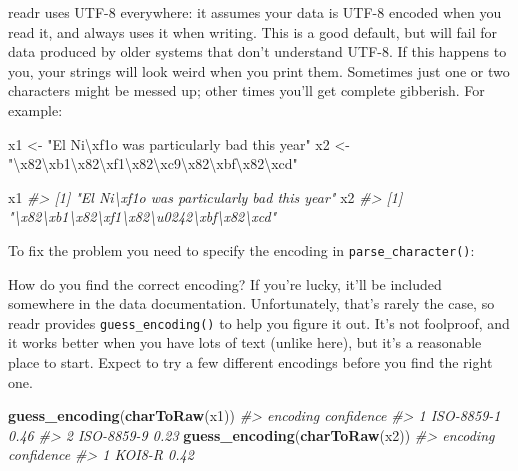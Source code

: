 \documentclass[]{book}
\newenvironment{Shaded}{\begin{snugshade}}{\end{snugshade}}
\newcommand{\KeywordTok}[1]{\textcolor[rgb]{0.13,0.29,0.53}{\textbf{{#1}}}}
\newcommand{\CharTok}[1]{\textcolor[rgb]{0.31,0.60,0.02}{{#1}}}
\newcommand{\StringTok}[1]{\textcolor[rgb]{0.31,0.60,0.02}{{#1}}}
\newcommand{\CommentTok}[1]{\textcolor[rgb]{0.56,0.35,0.01}{\textit{{#1}}}}
\newcommand{\NormalTok}[1]{{#1}}
\begin{document}
readr uses UTF-8 everywhere: it assumes your data is UTF-8 encoded when
you read it, and always uses it when writing. This is a good default,
but will fail for data produced by older systems that don't understand
UTF-8. If this happens to you, your strings will look weird when you
print them. Sometimes just one or two characters might be messed up;
other times you'll get complete gibberish. For example:

\begin{Shaded}
\begin{Highlighting}[]
\NormalTok{x1 <-}\StringTok{ "El Ni}\CharTok{\textbackslash{}xf1}\StringTok{o was particularly bad this year"}
\NormalTok{x2 <-}\StringTok{ "}\CharTok{\textbackslash{}x82\textbackslash{}xb1\textbackslash{}x82\textbackslash{}xf1\textbackslash{}x82\textbackslash{}xc9\textbackslash{}x82\textbackslash{}xbf\textbackslash{}x82\textbackslash{}xcd}\StringTok{"}

\NormalTok{x1}
\CommentTok{#> [1] "El Ni\textbackslash{}xf1o was particularly bad this year"}
\NormalTok{x2}
\CommentTok{#> [1] "\textbackslash{}x82\textbackslash{}xb1\textbackslash{}x82\textbackslash{}xf1\textbackslash{}x82\textbackslash{}u0242\textbackslash{}xbf\textbackslash{}x82\textbackslash{}xcd"}
\end{Highlighting}
\end{Shaded}

To fix the problem you need to specify the encoding in
\texttt{parse\_character()}:

How do you find the correct encoding? If you're lucky, it'll be included
somewhere in the data documentation. Unfortunately, that's rarely the
case, so readr provides \texttt{guess\_encoding()} to help you figure it
out. It's not foolproof, and it works better when you have lots of text
(unlike here), but it's a reasonable place to start. Expect to try a few
different encodings before you find the right one.

\begin{Shaded}
\begin{Highlighting}[]
\KeywordTok{guess_encoding}\NormalTok{(}\KeywordTok{charToRaw}\NormalTok{(x1))}
\CommentTok{#>     encoding confidence}
\CommentTok{#> 1 ISO-8859-1       0.46}
\CommentTok{#> 2 ISO-8859-9       0.23}
\KeywordTok{guess_encoding}\NormalTok{(}\KeywordTok{charToRaw}\NormalTok{(x2))}
\CommentTok{#>   encoding confidence}
\CommentTok{#> 1   KOI8-R       0.42}
\end{Highlighting}
\end{Shaded}
\end{document}
